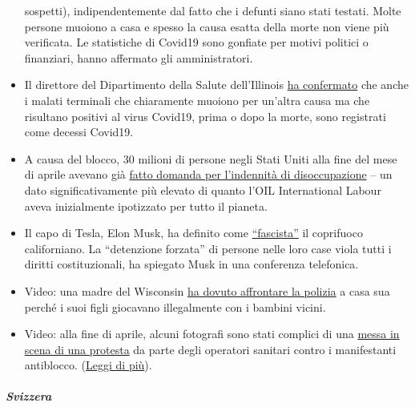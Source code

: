 \begin{itemize}
  sospetti), indipendentemente dal fatto che i defunti siano stati
  testati. Molte persone muoiono a casa e spesso la causa esatta della
  morte non viene più verificata. Le statistiche di Covid19 sono
  gonfiate per motivi politici o finanziari, hanno affermato gli
  amministratori.
\item
  Il direttore del Dipartimento della Salute dell'Illinois
  \href{https://week.com/2020/04/20/idph-director-explains-how-covid-deaths-are-classified/}{ha
  confermato} che anche i malati terminali che chiaramente muoiono per
  un'altra causa ma che risultano positivi al virus Covid19, prima o
  dopo la morte, sono registrati come decessi Covid19.
\item
  A causa del blocco, 30 milioni di persone negli Stati Uniti alla fine
  del mese di aprile avevano già
  \href{https://edition.cnn.com/2020/04/30/economy/unemployment-benefits-coronavirus/index.html}{fatto
  domanda per l'indennità di disoccupazione} -- un dato
  significativamente più elevato di quanto l'OIL International Labour
  aveva inizialmente ipotizzato per tutto il pianeta.
\item
  Il capo di Tesla, Elon Musk, ha definito come
  \href{https://www.theguardian.com/technology/2020/apr/29/tesla-quarterly-earnings-coronavirus-shares}{``fascista''}
  il coprifuoco californiano. La ``detenzione forzata'' di persone nelle
  loro case viola tutti i diritti costituzionali, ha spiegato Musk in
  una conferenza telefonica.
\item
  Video: una madre del Wisconsin
  \href{https://twitter.com/AlexBerenson/status/1256219418343981056}{ha
  dovuto affrontare la polizia} a casa sua perché i suoi figli giocavano
  illegalmente con i bambini vicini.
\item
  Video: alla fine di aprile, alcuni fotografi sono stati complici di
  una
  \href{https://twitter.com/talialikeitis/status/1253126254942773248}{messa
  in scena di una protesta} da parte degli operatori sanitari contro i
  manifestanti antiblocco.
  (\href{https://www.buzzfeednews.com/article/tasneemnashrulla/photos-denver-nurses-block-anti-lockdown-protest}{Leggi
  di più}).
\end{itemize}

\hypertarget{svizzera}{%
\subparagraph{\texorpdfstring{\textbf{Svizzera}}{Svizzera}}\label{svizzera}}

